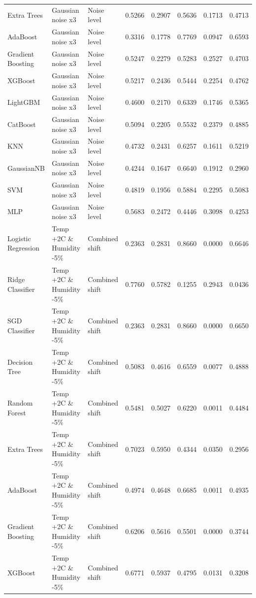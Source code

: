 \begin{tabular}{lllrrrrr}
Extra Trees & Gaussian noise x3 & Noise level & 0.5266 & 0.2907 & 0.5636 & 0.1713 & 0.4713 \\
AdaBoost & Gaussian noise x3 & Noise level & 0.3316 & 0.1778 & 0.7769 & 0.0947 & 0.6593 \\
Gradient Boosting & Gaussian noise x3 & Noise level & 0.5247 & 0.2279 & 0.5283 & 0.2527 & 0.4703 \\
XGBoost & Gaussian noise x3 & Noise level & 0.5217 & 0.2436 & 0.5444 & 0.2254 & 0.4762 \\
LightGBM & Gaussian noise x3 & Noise level & 0.4600 & 0.2170 & 0.6339 & 0.1746 & 0.5365 \\
CatBoost & Gaussian noise x3 & Noise level & 0.5094 & 0.2205 & 0.5532 & 0.2379 & 0.4885 \\
KNN & Gaussian noise x3 & Noise level & 0.4732 & 0.2431 & 0.6257 & 0.1611 & 0.5219 \\
GaussianNB & Gaussian noise x3 & Noise level & 0.4244 & 0.1647 & 0.6640 & 0.1912 & 0.2960 \\
SVM & Gaussian noise x3 & Noise level & 0.4819 & 0.1956 & 0.5884 & 0.2295 & 0.5083 \\
MLP & Gaussian noise x3 & Noise level & 0.5683 & 0.2472 & 0.4446 & 0.3098 & 0.4253 \\
Logistic Regression & Temp +2C \& Humidity -5\% & Combined shift & 0.2363 & 0.2831 & 0.8660 & 0.0000 & 0.6646 \\
Ridge Classifier & Temp +2C \& Humidity -5\% & Combined shift & 0.7760 & 0.5782 & 0.1255 & 0.2943 & 0.0436 \\
SGD Classifier & Temp +2C \& Humidity -5\% & Combined shift & 0.2363 & 0.2831 & 0.8660 & 0.0000 & 0.6650 \\
Decision Tree & Temp +2C \& Humidity -5\% & Combined shift & 0.5083 & 0.4616 & 0.6559 & 0.0077 & 0.4888 \\
Random Forest & Temp +2C \& Humidity -5\% & Combined shift & 0.5481 & 0.5027 & 0.6220 & 0.0011 & 0.4484 \\
Extra Trees & Temp +2C \& Humidity -5\% & Combined shift & 0.7023 & 0.5950 & 0.4344 & 0.0350 & 0.2956 \\
AdaBoost & Temp +2C \& Humidity -5\% & Combined shift & 0.4974 & 0.4648 & 0.6685 & 0.0011 & 0.4935 \\
Gradient Boosting & Temp +2C \& Humidity -5\% & Combined shift & 0.6206 & 0.5616 & 0.5501 & 0.0000 & 0.3744 \\
XGBoost & Temp +2C \& Humidity -5\% & Combined shift & 0.6771 & 0.5937 & 0.4795 & 0.0131 & 0.3208 \\

\end{tabular}
